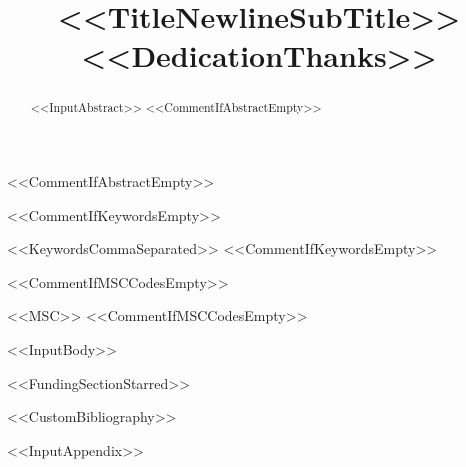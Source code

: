 \documentclass[<<DocumentClassOptions>>]{interact}
\begin{document}

\title{<<TitleNewlineSubTitle>><<DedicationThanks>>}

\author{%
}

\maketitle

<<CommentIfAbstractEmpty>>\begin{abstract}
<<InputAbstract>>
<<CommentIfAbstractEmpty>>\end{abstract}

<<CommentIfKeywordsEmpty>>\begin{keywords}
<<KeywordsCommaSeparated>>
<<CommentIfKeywordsEmpty>>\end{keywords}

<<CommentIfMSCCodesEmpty>>\begin{amscode}
<<MSC>>
<<CommentIfMSCCodesEmpty>>\end{amscode}

<<InputBody>>

<<FundingSectionStarred>>


<<CustomBibliography>>

\appendix
<<InputAppendix>>
\end{document}
